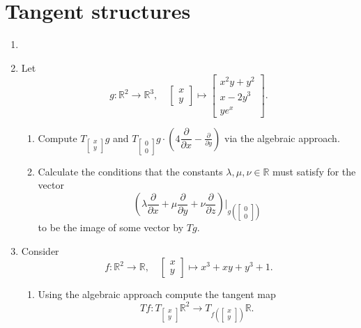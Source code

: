 \documentclass{article}
\begin{document}
\section{Tangent structures}

\begin{enumerate}[start=19]
  \item
  \item Let
  $$
  g:\mathbb{R}^{2}\rightarrow\mathbb{R}^{3},\quad
  \begin{bmatrix}x\\y\end{bmatrix}\mapsto
  \begin{bmatrix}x^{2}y+y^{2}\\x-2y^{3}\\ye^{x}\end{bmatrix}.
  $$

  \begin{enumerate}
    \item Compute $T_{\left[\begin{smallmatrix}x\\y\end{smallmatrix}\right]}g$ and $T_{\left[\begin{smallmatrix}0\\0\end{smallmatrix}\right]}g\cdot\left(4\dfrac{\partial}{\partial x}-\frac{\partial}{\partial y}\right)$ via the algebraic approach.
    \item Calculate the conditions that the constants $\lambda,\mu,\nu\in\mathbb{R}$ must satisfy for the vector
    $$
    \left(\lambda\frac{\partial}{\partial x}+\mu\frac{\partial}{\partial y}+\nu\frac{\partial}{\partial z}\right)
    \Bigg|_{g\left(\left[\begin{smallmatrix}0\\0\end{smallmatrix}\right]\right)}
    $$
    to be the image of some vector by $Tg$.
  \end{enumerate}

  \item Consider
  $$
  f:\mathbb{R}^{2}\rightarrow\mathbb{R},\quad
  \begin{bmatrix}x\\y\end{bmatrix}\mapsto
  x^{3}+xy+y^{3}+1.
  $$

  \begin{enumerate}
    \item Using the algebraic approach compute the tangent map
    $$
    Tf:T_{\left[\begin{smallmatrix}x\\y\end{smallmatrix}\right]}\mathbb{R}^{2}
    \rightarrow T_{f\left(\left[\begin{smallmatrix}x\\y\end{smallmatrix}\right]\right)}\mathbb{R}.
    $$


\end{enumerate}
\end{enumerate}
\end{document}
